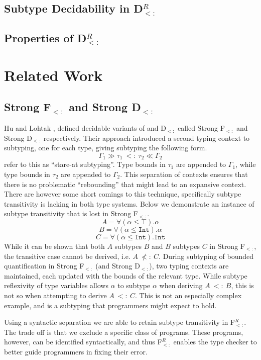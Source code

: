 \documentclass[runningheads]{llncs}
\begin{document}
\subsection{Subtype Decidability in D$_{<:}^R$}

\subsection{Properties of D$_{<:}^R$}




\section{Related Work}

\subsection{Strong F$_{<:}$ and Strong D$_{<:}$}
Hu and Lohtak \cite{jason hu}, defined decidable variants of \Fsub and D$_{<:}$ called Strong F$_{<:}$ and Strong D$_{<:}$ respectively.
Their approach introduced a second typing context to subtyping, one for each type, giving subtyping the following form. 
$$\Gamma_1 \gg \tau_1\ <:\ \tau_2 \ll \Gamma_2$$
\citeauthor{Hu and Lohtak} refer to this as ``stare-at subtyping''. Type bounds in $\tau_1$ are appended to $\Gamma_1$, while type bounds in $\tau_2$ are appended to $\Gamma_2$. 
This separation of contexts ensures that there is no 
problematic ``rebounding'' \cite{pierce} that might lead to an expansive context. There are however some short comings to this technique, 
specifically subtype transitivity is lacking in both type systems. Below we demonstrate an instance of subtype transitivity  that is lost in 
Strong F$_{<:}$.
$$A = \forall(\alpha \leqslant \top).\alpha$$
$$B = \forall(\alpha \leqslant \texttt{Int}).\alpha$$
$$C = \forall(\alpha \leqslant \texttt{Int}).\texttt{Int}$$
While it can be shown that both $A$ subtypes $B$ and $B$ subtypes $C$ in Strong F$_{<:}$, the transitive case cannot be derived, i.e.
$A\ \not<:\ C$. During subtyping of bounded quantification in Strong F$_{<:}$ (and Strong D$_{<:}$), two typing contexts are maintained, each updated with 
the bounds of the relevant type. While subtype reflexivity of type variables allows $\alpha$ to subtype $\alpha$ when deriving $A\ <:\ B$, 
this is not so when attempting to derive $A\ <:\ C$.
This is not an especially complex example, and is a subtyping that programmers might expect to hold.

Using a syntactic separation we are able to retain subtype transitivity in F$_{<:}^R$. The trade off is that we exclude a specific class of 
programs. These programs, however, can be identified syntactically, and thus F$_{<:}^R$ enables the type checker to better guide programmers in fixing their error.
\end{document}
